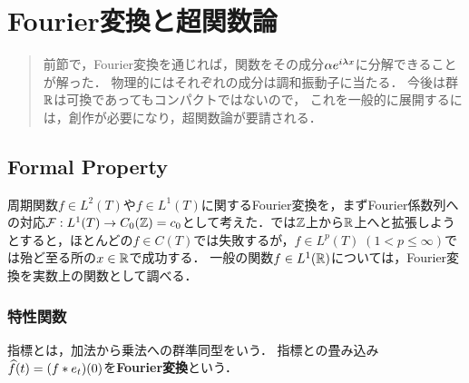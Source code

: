 \documentclass[uplatex,dvipdfmx]{jsreport}
\begin{document}
\chapter{Fourier変換と超関数論}

\begin{quotation}
    前節で，Fourier変換を通じれば，関数をその成分$\alpha e^{i\lambda x}$に分解できることが解った．
    物理的にはそれぞれの成分は調和振動子に当たる．
    今後は群$\mathbb{R}$は可換であってもコンパクトではないので，
    これを一般的に展開するには，創作が必要になり，超関数論が要請される．
\end{quotation}

\section{Formal Property}

\begin{tcolorbox}[colframe=ForestGreen, colback=ForestGreen!10!white,breakable,colbacktitle=ForestGreen!40!white,coltitle=black,fonttitle=\bfseries\sffamily,
title=]
    周期関数$f\in L^2(T)$や$f\in L^1(T)$に関するFourier変換を，まずFourier係数列への対応$\mathcal{F}:L^1(T)\to C_0(\mathbb{Z})=c_0$として考えた．では$\mathbb{Z}$上から$\mathbb{R}$上へと拡張しようとすると，ほとんどの$f\in C(T)$では失敗するが，$f\in L^p(T)\;(1<p\le\infty)$では殆ど至る所の$x\in\mathbb{R}$で成功する．
    一般の関数$f\in L^1(\mathbb{R})$については，Fourier変換を実数上の関数として調べる．
\end{tcolorbox}

\subsection{特性関数}

\begin{tcolorbox}[colframe=ForestGreen, colback=ForestGreen!10!white,breakable,colbacktitle=ForestGreen!40!white,coltitle=black,fonttitle=\bfseries\sffamily,
title=]
    指標とは，加法から乗法への群準同型をいう．
    指標との畳み込み$\widehat{f}(t)=(f*e_t)(0)$を\textbf{Fourier変換}という．
\end{tcolorbox}
\end{document}
